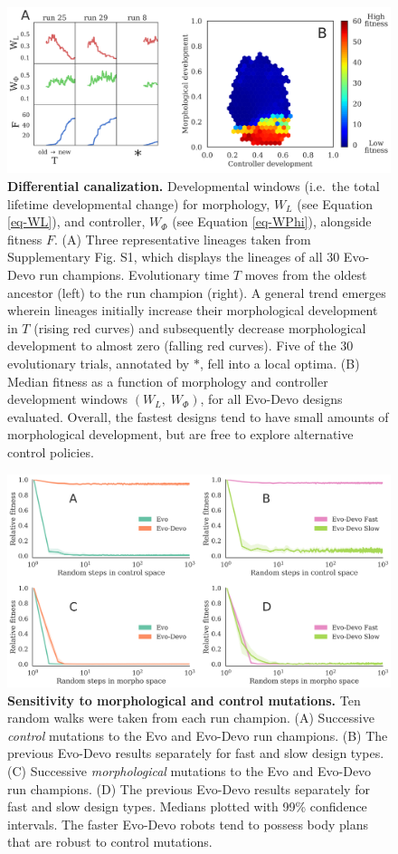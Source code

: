 \begin{figure}
\centering
\includegraphics[width=\linewidth]{Fig4}
\caption{\label{fig-correlation}\textbf{Differential canalization.} 
Developmental windows (i.e.~the total lifetime developmental change) for morphology, $W_L$ (see Equation \ref{eq-WL}), and controller, $W_{\Phi}$ (see Equation \ref{eq-WPhi}), alongside fitness $F$.
(A) Three representative lineages taken from Supplementary Fig. S1, which displays the lineages of all 30 Evo-Devo run champions. Evolutionary time $T$ moves from the oldest ancestor (left) to the run champion (right). A general trend emerges wherein lineages initially increase their morphological development in $T$ (rising red curves) and subsequently decrease morphological development to almost zero (falling red curves). Five of the 30 evolutionary trials, annotated by {\Large $\ast$}, fell into a local optima.
(B) Median fitness as a function of morphology and controller development windows $(W_L,\; W_{\Phi})$, for all Evo-Devo designs evaluated. 
Overall, the fastest designs tend to have small amounts of morphological development, but are free to explore alternative control policies.}
\end{figure}

\begin{figure}
\centering
\includegraphics[width=\linewidth]{Fig5}
\caption{\label{fig-random-walks}\textbf{Sensitivity to morphological and control mutations.}
Ten random walks were taken from each run champion.
(A) Successive \textit{control} mutations to the Evo and Evo-Devo run champions.
(B) The previous Evo-Devo results separately for fast and slow design types.
(C) Successive \textit{morphological} mutations to the Evo and Evo-Devo run champions.
(D) The previous Evo-Devo results separately for fast and slow design types. Medians plotted with 99\% confidence intervals.
The faster Evo-Devo robots tend to possess body plans that are robust to control mutations.}
\end{figure}

